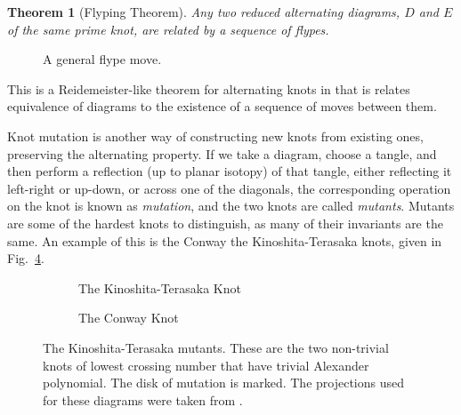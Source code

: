 \documentclass[12pt]{report}
\newtheorem*{theorem}{Theorem}
\theoremstyle{upright}
\begin{document}
\begin{theorem}[Flyping Theorem]
Any two reduced alternating diagrams, $D$ and $E$ of the same prime knot, are related by a sequence of flypes.
\end{theorem}

\begin{figure}[hbt]
	\centering
	\def\svgscale{0.5}
	
	\caption{A general flype move.}
	\label{fig:flype}
\end{figure}

This is a Reidemeister-like theorem for alternating knots in that is relates equivalence of diagrams to the existence of a sequence of moves between them.

Knot mutation is another way of constructing new knots from existing ones, preserving the alternating property. If we take a diagram, choose a tangle, and then perform a reflection (up to planar isotopy) of that tangle, either reflecting it left-right or up-down, or across one of the diagonals, the corresponding operation on the knot is known as \textit{mutation}, and the two knots are called \textit{mutants}. Mutants are some of the hardest knots to distinguish, as many of their invariants are the same. An example of this is the Conway the Kinoshita-Terasaka knots, given in Fig.~\ref{fig:kinoshita-terasaka-mutants}.

\begin{figure}[hbt!]
	\centering
	\hspace*{\fill}
	\begin{subfigure}[b]{0.4 \textwidth}
		\centering
		\def\svgscale{0.25}
		
		\caption{The Kinoshita-Terasaka Knot}
		\label{fig:kinoshita-terasaka-knot}
	\end{subfigure}
	\hspace*{\fill} \hspace*{\fill}	\hspace*{\fill}
	\begin{subfigure}[b]{0.4 \textwidth}
		\centering
		\def\svgscale{0.25}
		
		\caption{The Conway Knot}
		\label{fig:conway-knot}
	\end{subfigure}
	\hspace*{\fill} 
	\caption{The Kinoshita-Terasaka mutants. These are the two non-trivial knots of lowest crossing number that have trivial Alexander polynomial. The disk of mutation is marked. The projections used for these diagrams were taken from \cite[Fig.~2.32]{the-knot-book}.}
	\label{fig:kinoshita-terasaka-mutants}
\end{figure}
\end{document}
